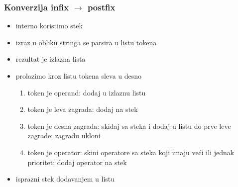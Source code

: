 \documentclass[compress,aspectratio=169]{beamer}
\begin{document}
\begin{frame}[fragile]
  \frametitle{Konverzija infix $\rightarrow$ postfix}
  \begin{itemize}
    \item interno koristimo stek
    \item izraz u obliku stringa se parsira u listu tokena
    \item rezultat je izlazna lista
    \item prolazimo kroz listu tokena sleva u desno
    \begin{enumerate}
      \item token je operand: dodaj u izlaznu listu
      \item token je leva zagrada: dodaj na stek
      \item token je desna zagrada: skidaj sa steka i dodaj u listu do prve leve zagrade; zagradu ukloni
      \item token je operator: skini operatore sa steka koji imaju veći ili jednak prioritet; dodaj operator na stek
    \end{enumerate}
    \item isprazni stek dodavanjem u listu
  \end{itemize}
\end{frame}
\end{document}
